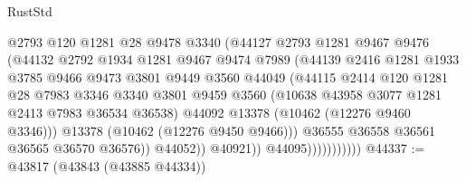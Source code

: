 \begin{lexlean}{RustStd}
\begin{coremodule}
                                  @2793
                                  @120
                                  @1281
                                  @28
                                  @9478
                                  @3340
                                  (@44127
                                    @2793
                                    @1281
                                    @9467
                                    @9476
                                    (@44132
                                      @2792
                                      @1934
                                      @1281
                                      @9467
                                      @9474
                                      @7989
                                      (@44139
                                        @2416
                                        @1281
                                        @1933
                                        @3785
                                        @9466
                                        @9473
                                        @3801
                                        @9449
                                        @3560
                                        @44049
                                        (@44115
                                          @2414
                                          @120
                                          @1281
                                          @28
                                          @7983
                                          @3346
                                          @3340
                                          @3801
                                          @9459
                                          @3560
                                          (@10638 @43958 @3077 @1281 @2413 @7983 @36534 @36538)
                                          @44092
                                          @13378
                                          (@10462 (@12276 @9460 @3346)))
                                        @13378
                                        (@10462 (@12276 @9450 @9466)))
                                      @36555
                                      @36558
                                      @36561
                                      @36565
                                      @36570
                                      @36576))
                                  @44052))
                              @40921))
                          @44095)))))))))))
@44337 := @43817 (@43843 (@43885 @44334))

\end{coremodule}
\end{lexlean}
